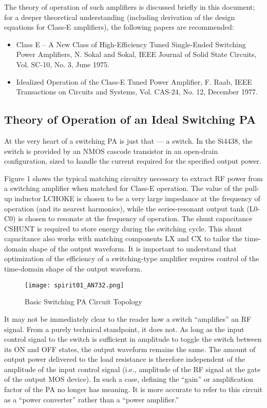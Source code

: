     The theory of operation of such amplifiers is discussed briefly in this document; for a deeper 
    theoretical understanding (including derivation of the design equations for Class-E amplifiers), the 
    following papers are recommended:
    \begin{itemize}
      \item Class E – A New Class of High-Efficiency Tuned Single-Ended Switching Power Amplifiers, N. 
      Sokal and Sokal, IEEE Journal of Solid State Circuits, Vol. SC-10, No. 3, June 1975.
      \item Idealized Operation of the Class-E Tuned Power Amplifier, F. Raab, IEEE Transactions on 
      Circuits and Systems, Vol. CAS-24, No. 12, December 1977.
    \end{itemize}
  
    \subsection{Theory of Operation of an Ideal Switching PA}
      At the very heart of a switching PA is just that — a switch. In the Si4438, the switch is provided by 
      an NMOS cascode transistor in an open-drain configuration, sized to handle the current required for 
      the specified output power.

      Figure 1 shows the typical matching circuitry necessary to extract RF power from a switching 
      amplifier when matched for Class-E operation. The value of the pull-up inductor LCHOKE is chosen to 
      be a very large impedance at the frequency of operation (and its nearest harmonics), while the 
      series-resonant output tank (L0-C0) is chosen to resonate at the frequency of  operation. The shunt 
      capacitance CSHUNT is required to store energy during the switching cycle. This shunt capacitance 
      also works with matching components LX and CX to tailor the time-domain shape of the output waveform. 
      It is important to understand that optimization of the efficiency of a switching-type amplifier 
      requires control of the time-domain shape of the output waveform.

      \begin{figure}[ht!]  %
        \centering
        \texttt{[image: spirit01\_AN732.png]}
        \caption{Basic Switching PA Circuit Topology}
        \label{EXP001:fig_spirit01}
      \end{figure}        

      It may not be immediately clear to the reader how a switch “amplifies” an RF signal. From a purely 
      technical standpoint, it does not. As long as the input control signal to the switch is sufficient in 
      amplitude to toggle the switch between its ON and OFF states, the output waveform remains the same. 
      The amount of output power delivered to the load resistance is therefore independent of the amplitude 
      of the input control signal (i.e., amplitude of the RF signal at the gate of the output MOS device). 
      In such a case, defining the “gain” or amplification factor of the PA no longer has meaning. It is 
      more accurate to refer to this circuit as a “power converter” rather than a “power amplifier.”
      
